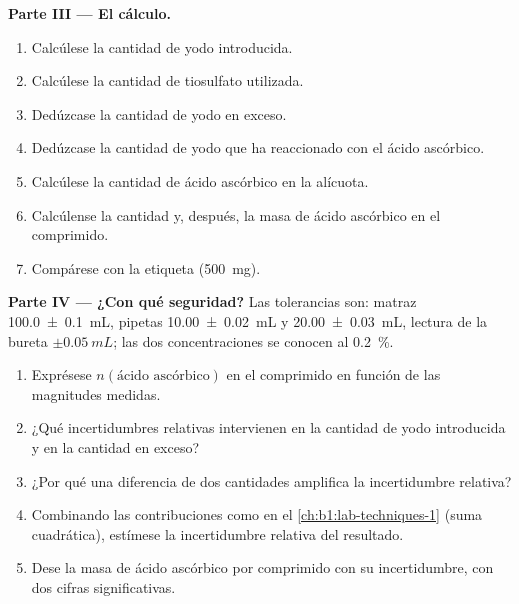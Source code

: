 \begin{problem}
\medskip
\noindent\textbf{Parte III --- El cálculo.}
\begin{enumerate}[resume]
  \item Calcúlese la cantidad de yodo introducida.
  \item Calcúlese la cantidad de tiosulfato utilizada.
  \item Dedúzcase la cantidad de yodo en exceso.
  \item Dedúzcase la cantidad de yodo que ha reaccionado con el ácido
        ascórbico.
  \item Calcúlese la cantidad de ácido ascórbico en la alícuota.
  \item Calcúlense la cantidad y, después, la masa de ácido ascórbico en
        el comprimido.
  \item Compárese con la etiqueta (\qty{500}{mg}).
\end{enumerate}

\medskip
\noindent\textbf{Parte IV --- ¿Con qué seguridad?}
Las tolerancias son: matraz \qty{100.0 \pm 0.1}{mL}, pipetas
\qty{10.00 \pm 0.02}{mL} y \qty{20.00 \pm 0.03}{mL}, lectura de la bureta
$\pm\qty{0.05}{mL}$; las dos concentraciones se conocen al
\qty{0.2}{\percent}.
\begin{enumerate}[resume]
  \item Exprésese $n(\text{ácido ascórbico})$ en el comprimido en función
        de las magnitudes medidas.
  \item ¿Qué incertidumbres relativas intervienen en la cantidad de yodo
        introducida y en la cantidad en exceso?
  \item ¿Por qué una diferencia de dos cantidades amplifica la
        incertidumbre relativa?
  \item Combinando las contribuciones como en el
        \cref{ch:b1:lab-techniques-1} (suma cuadrática), estímese la
        incertidumbre relativa del resultado.
  \item Dese la masa de ácido ascórbico por comprimido con su
        incertidumbre, con dos cifras significativas.
\end{enumerate}
\end{problem}
